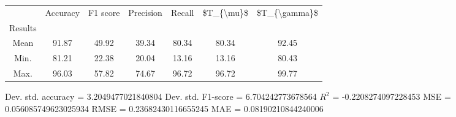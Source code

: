 \begin{tabular}{|c|c|c|c|c|c|c|}
\toprule
{} &  Accuracy &  F1 score &  Precision &  Recall &  \$T\_\{\textbackslash mu\}\$ &  \$T\_\{\textbackslash gamma\}\$ \\
Results &           &           &            &         &            &               \\
\hline
Mean    &     91.87 &     49.92 &      39.34 &   80.34 &      80.34 &         92.45 \\
Min.    &     81.21 &     22.38 &      20.04 &   13.16 &      13.16 &         80.43 \\
Max.    &     96.03 &     57.82 &      74.67 &   96.72 &      96.72 &         99.77 \\
\bottomrule
\end{tabular}

 Dev. std. accuracy = 3.2049477021840804
 Dev. std. F1-score = 6.704242773678564
 $R^2$ = -0.2208274097228453
 MSE = 0.056085749623025934
 RMSE = 0.23682430116655245
 MAE = 0.08190210844240006